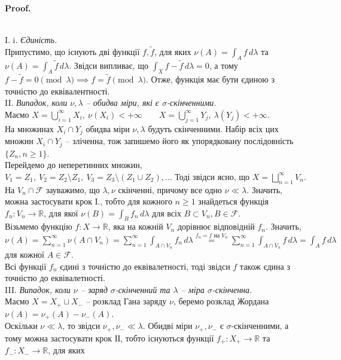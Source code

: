 \documentclass[a4paper, 10pt]{article}
\makeatletter
\theoremstyle{theoremdd}
\renewenvironment{proof}[1][Proof.\\]{\par
\pushQED{\hfill \qed}%
\normalfont \topsep6\p@\@plus6\p@\relax
\trivlist
\item\relax
{\bfseries
#1\@addpunct{.}}\hspace\labelsep\ignorespaces
}{%
\popQED\endtrivlist\@endpefalse
}
\makeatother
\begin{document}
\begin{proof}
\bigskip \\
I. i. \textit{Єдиність.}\\
Припустимо, що існують дві функції $f,\tilde{f}$, для яких $\nu(A) = \displaystyle\int_A f\,d\lambda$ та $\nu(A) = \displaystyle\int_A \tilde{f}\,d\lambda$. Звідси випливає, що $\displaystyle\int_X f-\tilde{f}\,d\lambda = 0$, а тому $f - \tilde{f} = 0 \pmod \lambda \implies f = \tilde{f} \pmod \lambda$. Отже, функція має бути єдиною з точністю до еквівалентності.
\bigskip \\
II. \textit{Випадок, коли $\nu, \lambda$ -- обидва міри, які є $\sigma$-скінченними.}\\
Маємо $X = \displaystyle\bigcup_{i=1}^\infty X_i,\ \nu(X_i) < +\infty \qquad X  = \displaystyle\bigcup_{j=1}^\infty Y_j,\ \lambda(Y_j) < +\infty$.\\
На множинах $X_i \cap Y_j$ обидва міри $\nu,\lambda$ будуть скінченними. Набір всіх цих множин $X_i \cap Y_j$ -- зліченна, тож запишемо його як упорядковану послідовність $\{Z_n, n \geq 1\}$.\\
Перейдемо до неперетинних множин, $V_1 = Z_1,\ V_2 = Z_2 \setminus Z_1,\ V_3 = Z_3 \setminus (Z_1 \cup Z_2), \dots$ Тоді звідси ясно, що $X = \displaystyle\bigsqcup_{n=1}^\infty V_n$. На $V_n \cap \mathcal{F}$ зауважимо, що $\lambda,\nu$ скінченні, причому все одно $\nu \ll \lambda$. Значить, можна застосувати крок І., тобто для кожного $n \geq 1$ знайдеться функція $f_n \colon V_n \to \mathbb{R}$, для якої $\nu(B) = \displaystyle\int_B f_n\,d\lambda$ для всіх $B \subset V_n, B \in \mathcal{F}$.\\
Візьмемо функцію $f \colon X \to \mathbb{R}$, яка на кожній $V_n$ дорівнює відповідній $f_n$. Значить, \\
$\nu(A) = \displaystyle\sum_{n=1}^\infty \nu(A \cap V_n) = \sum_{n=1}^\infty \int_{A \cap V_n} f_n\,d\lambda \overset{f_n = f \text{ на }V_n}{=} \sum_{n=1}^\infty \int_{A \cap V_n}f\,d\lambda = \int_A f\,d\lambda$ для кожної $A \in \mathcal{F}$.\\
Всі функції $f_n$ єдині з точністю до еквівалетності, тоді звідси $f$ також єдина з точністю до еквівалетності.
\bigskip \\
III. \textit{Випадок, коли $\nu$ -- заряд $\sigma$-скінченний та $\lambda$ -- міра $\sigma$-скінченна.}\\
Маємо $X = X_+ \sqcup X_-$ -- розклад Гана заряду $\nu$, беремо розклад Жордана $\nu(A) = \nu_+(A) - \nu_-(A)$.\\
Оскільки $\nu \ll \lambda$, то звідси $\nu_+,\nu_- \ll \lambda$. Обидві міри $\nu_+,\nu_-$ є $\sigma$-скінченними, а тому можна застосувати крок ІІ, тобто існуються функції $f_+ \colon X_+ \to \mathbb{R}$ та $f_- \colon X_- \to \mathbb{R}$, для яких\\

\end{proof}
\end{document}
